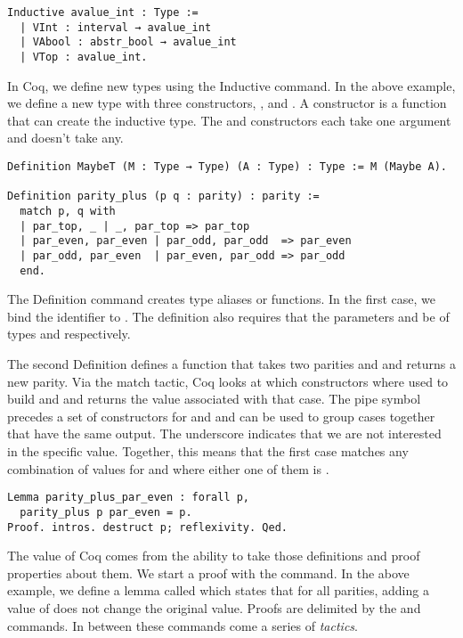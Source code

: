 \begin{verbatim}
Inductive avalue_int : Type := 
  | VInt : interval → avalue_int
  | VAbool : abstr_bool → avalue_int
  | VTop : avalue_int.
\end{verbatim}
In Coq, we define new types using the Inductive command. In the above example,
we define a new type  with three constructors, ,
 and . A constructor is a function that can create the
inductive type. The  and  constructors each take one
argument and  doesn't take any.

\begin{verbatim}
Definition MaybeT (M : Type → Type) (A : Type) : Type := M (Maybe A).

Definition parity_plus (p q : parity) : parity :=
  match p, q with 
  | par_top, _ | _, par_top => par_top
  | par_even, par_even | par_odd, par_odd  => par_even
  | par_odd, par_even  | par_even, par_odd => par_odd
  end.
\end{verbatim}

The Definition command creates type aliases or functions. In the first case, we
bind the identifier  to . The definition
also requires that the parameters  and  be of types  and  respectively.

The second Definition defines a function  that takes 
two parities  and  and returns a new parity. Via the match
tactic, Coq looks at which constructors where used to build  and
 and returns the value associated with that case. The pipe symbol \coq{| }
precedes a set of constructors for  and  and can be used to
group cases together that have the same output. The underscore indicates that
we are not interested in the specific value. Together, this means that the
first case  matches any combination
of values for  and  where either one of them is .

\begin{verbatim}
Lemma parity_plus_par_even : forall p,
  parity_plus p par_even = p.
Proof. intros. destruct p; reflexivity. Qed.
\end{verbatim}

The value of Coq comes from the ability to take those definitions and proof
properties about them. We start a proof with the  command. In the
above example, we define a lemma called  which
states that for all parities, adding a value of  does not change
the original value. Proofs are delimited by the  and  
commands. In between these commands come a series of \emph{tactics}. 

